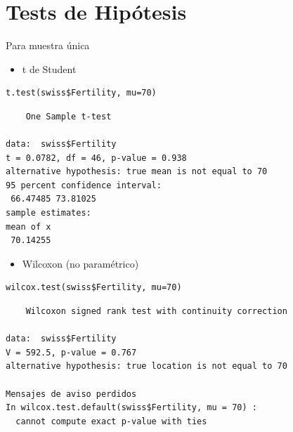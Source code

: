\documentclass[xcolor={usenames,svgnames,dvipsnames}]{beamer}
\begin{document}
\section{Tests de Hipótesis}
\label{sec-4}
\begin{frame}[fragile,label=sec-4-1]{Para muestra única}
 \begin{itemize}
\item t de Student
\end{itemize}
\lstset{language=R,label= ,caption= ,numbers=none}
\begin{lstlisting}
t.test(swiss$Fertility, mu=70)
\end{lstlisting}

\begin{verbatim}
	One Sample t-test

data:  swiss$Fertility
t = 0.0782, df = 46, p-value = 0.938
alternative hypothesis: true mean is not equal to 70
95 percent confidence interval:
 66.47485 73.81025
sample estimates:
mean of x 
 70.14255
\end{verbatim}

\begin{itemize}
\item Wilcoxon (no paramétrico)
\end{itemize}
\lstset{language=R,label= ,caption= ,numbers=none}
\begin{lstlisting}
wilcox.test(swiss$Fertility, mu=70)
\end{lstlisting}

\begin{verbatim}
	Wilcoxon signed rank test with continuity correction

data:  swiss$Fertility
V = 592.5, p-value = 0.767
alternative hypothesis: true location is not equal to 70

Mensajes de aviso perdidos
In wilcox.test.default(swiss$Fertility, mu = 70) :
  cannot compute exact p-value with ties
\end{verbatim}
\end{frame}
\end{document}
